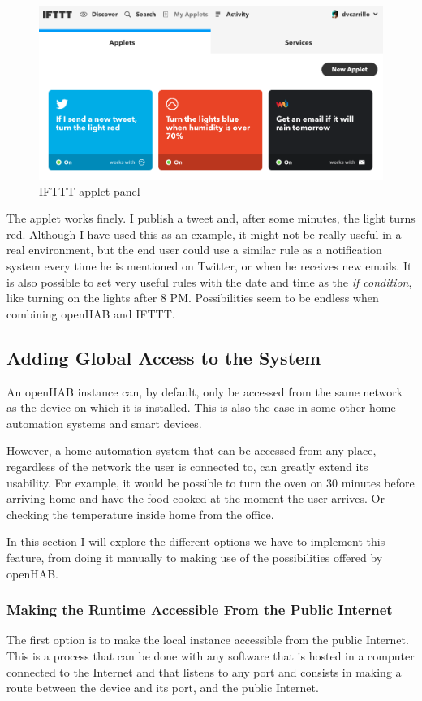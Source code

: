 \begin{figure}
	\centering
	\includegraphics[width=1\textwidth]{images/Chapter_06/iftt-applet-panel.png}
	\caption{IFTTT applet panel}
	\label{fig:iftt-applet-panel}
\end{figure}

The applet works finely. I publish a tweet and, after some minutes, the light turns red. Although I have used this as an example,
it might not be really useful in a real environment, but the end user could use a similar rule as a notification system every time
he is mentioned on Twitter, or when he receives new emails. It is also possible to set very useful rules with the date and time as
the \textit{if condition}, like turning on the lights after 8 PM. Possibilities seem to be endless when combining openHAB and IFTTT.

\subsection{Adding Global Access to the System}
An openHAB instance can, by default, only be accessed from the same network as the device on which it is installed. This is also
the case in some other home automation systems and smart devices.

However, a home automation system that can be accessed from any place, regardless of the network the user is connected to, can
greatly extend its usability. For example, it would be possible to turn the oven on 30 minutes before arriving home and have the
food cooked at the moment the user arrives. Or checking the temperature inside home from the office.

In this section I will explore the different options we have to implement this feature, from doing it manually to making use of
the possibilities offered by openHAB.

\subsubsection{Making the Runtime Accessible From the Public Internet}
The first option is to make the local instance accessible from the public Internet. This is a process that can be done with any
software that is hosted in a computer connected to the Internet and that listens to any port and consists in making a route
between the device and its port, and the public Internet.\cite{nchPublicInternet}

